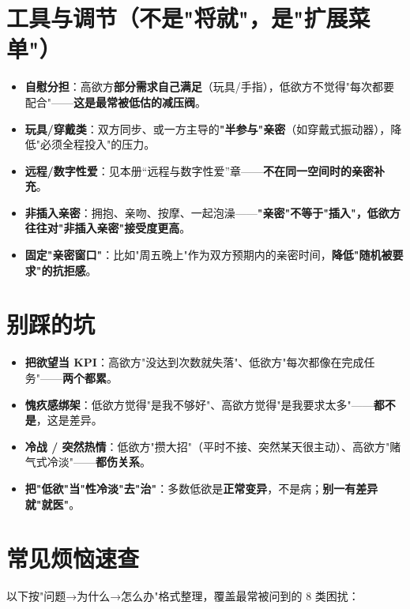 \documentclass[12pt,UTF8,openany]{ctexbook}
\begin{document}
\section{工具与调节（不是"将就"，是"扩展菜单"）}
\begin{itemize}[leftmargin=2em,itemsep=0.3em]
  \item \textbf{自慰分担}：高欲方\textbf{部分需求自己满足}（玩具/手指），低欲方不觉得"每次都要配合"——\textbf{这是最常被低估的减压阀}。
  \item \textbf{玩具/穿戴类}：双方同步、或一方主导的\textbf{"半参与"亲密}（如穿戴式振动器），降低"必须全程投入"的压力。
  \item \textbf{远程/数字性爱}：见本册“远程与数字性爱”章——\textbf{不在同一空间时的亲密补充}。
  \item \textbf{非插入亲密}：拥抱、亲吻、按摩、一起泡澡——\textbf{"亲密"不等于"插入"，低欲方往往对"非插入亲密"接受度更高}。
  \item \textbf{固定"亲密窗口"}：比如"周五晚上"作为双方预期内的亲密时间，\textbf{降低"随机被要求"的抗拒感}。
\end{itemize}

\section{别踩的坑}
\begin{itemize}[leftmargin=2em,itemsep=0.3em]
  \item \textbf{把欲望当 KPI}：高欲方"没达到次数就失落"、低欲方"每次都像在完成任务"——\textbf{两个都累}。
  \item \textbf{愧疚感绑架}：低欲方觉得"是我不够好"、高欲方觉得"是我要求太多"——\textbf{都不是}，这是差异。
  \item \textbf{冷战 / 突然热情}：低欲方"攒大招"（平时不接、突然某天很主动）、高欲方"赌气式冷淡"——\textbf{都伤关系}。
  \item \textbf{把"低欲"当"性冷淡"去"治"}：多数低欲是\textbf{正常变异}，不是病；\textbf{别一有差异就"就医"}。
\end{itemize}

\section{常见烦恼速查}

以下按"问题→为什么→怎么办"格式整理，覆盖最常被问到的 8 类困扰：
\end{document}
